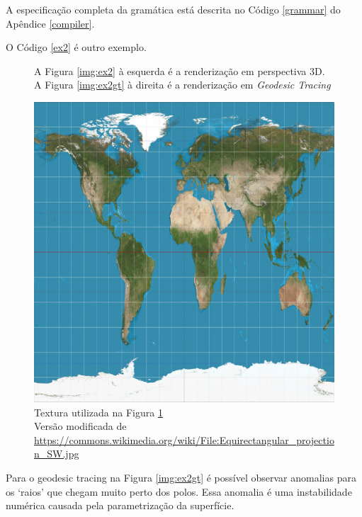 A especificação completa da gramática está descrita no Código \ref{grammar}
do Apêndice \ref{compiler}.

\newpage

O Código \ref{ex2} é outro exemplo.

\begin{figure}[!ht]
\centering
{}
\hfil
{}
\caption[Renderizações do Código \ref{ex2}]
{A Figura \ref{img:ex2} à esquerda é a renderização em perspectiva 3D.
A Figura \ref{img:ex2gt} à direita é a renderização em \textit{Geodesic Tracing}}
\label{img:ex2Both}
\end{figure}

\begin{figure}[!ht]
    \centering
    \includegraphics[width=0.6\linewidth, frame]{map.png}
    \caption[Textura utilizada na Figura \ref{img:ex2Both}]{Textura utilizada na Figura \ref{img:ex2Both} \\ Versão modificada de \url{https://commons.wikimedia.org/wiki/File:Equirectangular\_projection\_SW.jpg}}
    \label{img:original}
\end{figure}

Para o geodesic tracing na Figura \ref{img:ex2gt} é possível observar anomalias para
os `raios' que chegam muito perto dos polos. Essa anomalia é uma instabilidade numérica
causada pela parametrização da superfície.